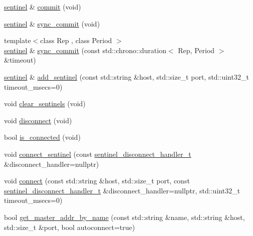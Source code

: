 \begin{DoxyCompactItemize}
\item 
\hyperlink{classcpp__redis_1_1sentinel}{sentinel} \& \hyperlink{classcpp__redis_1_1sentinel_ad4f85d486499f82225b244f85091b31e}{commit} (void)
\item 
\hyperlink{classcpp__redis_1_1sentinel}{sentinel} \& \hyperlink{classcpp__redis_1_1sentinel_a8e4d231ac89510c337fe97fe9e642785}{sync\+\_\+commit} (void)
\item 
{\footnotesize template$<$class Rep , class Period $>$ }\\\hyperlink{classcpp__redis_1_1sentinel}{sentinel} \& \hyperlink{classcpp__redis_1_1sentinel_afbaa0b80266f70ad98c0bf8f28c533ab}{sync\+\_\+commit} (const std\+::chrono\+::duration$<$ Rep, Period $>$ \&timeout)
\item 
\hyperlink{classcpp__redis_1_1sentinel}{sentinel} \& \hyperlink{classcpp__redis_1_1sentinel_a6c846b71478c330d2cad7aa662dfd681}{add\+\_\+sentinel} (const std\+::string \&host, std\+::size\+\_\+t port, std\+::uint32\+\_\+t timeout\+\_\+msecs=0)
\item 
void \hyperlink{classcpp__redis_1_1sentinel_ac36640b3f392970c72f5a513a2d61ac7}{clear\+\_\+sentinels} (void)
\item 
void \hyperlink{classcpp__redis_1_1sentinel_a7ae4a9c32b8ebd9a1c7d3cc8686a7f69}{disconnect} (void)
\item 
bool \hyperlink{classcpp__redis_1_1sentinel_aa98a0593e6e7c04d8d0dd1f292cdce47}{is\+\_\+connected} (void)
\item 
void \hyperlink{classcpp__redis_1_1sentinel_a82c8cb23efab71ff00cf2277bba91e90}{connect\+\_\+sentinel} (const \hyperlink{classcpp__redis_1_1sentinel_a923e06b5b700c16dffec8a01d2fa9aa4}{sentinel\+\_\+disconnect\+\_\+handler\+\_\+t} \&disconnect\+\_\+handler=nullptr)
\item 
void \hyperlink{classcpp__redis_1_1sentinel_a1dfba8240daf7cfa7502f57957cffbda}{connect} (const std\+::string \&host, std\+::size\+\_\+t port, const \hyperlink{classcpp__redis_1_1sentinel_a923e06b5b700c16dffec8a01d2fa9aa4}{sentinel\+\_\+disconnect\+\_\+handler\+\_\+t} \&disconnect\+\_\+handler=nullptr, std\+::uint32\+\_\+t timeout\+\_\+msecs=0)
\item 
bool \hyperlink{classcpp__redis_1_1sentinel_a2886493b40b00dfafdd3b22dfe28e0c3}{get\+\_\+master\+\_\+addr\+\_\+by\+\_\+name} (const std\+::string \&name, std\+::string \&host, std\+::size\+\_\+t \&port, bool autoconnect=true)
\item 
\mbox{\label{classcpp__redis_1_1sentinel_aaed03955e468d9f7c3df37376ecafc3a}} 

\end{DoxyCompactItemize}
